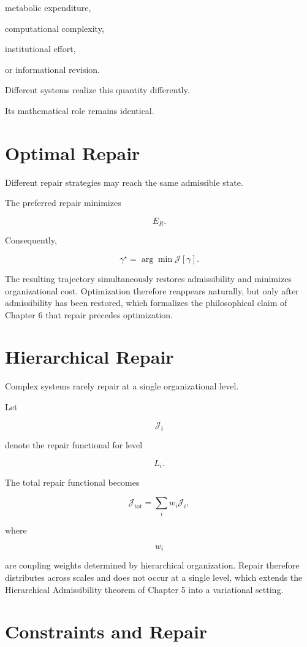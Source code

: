 \documentclass[11pt,oneside]{book}
\numberwithin{equation}{chapter}
\theoremstyle{definition}
\theoremstyle{plain}
\begin{document}
metabolic expenditure,

computational complexity,

institutional effort,

or informational revision.

Different systems realize this quantity differently.

Its mathematical role remains identical.

\section{Optimal Repair}

Different repair strategies may reach the same admissible state.

The preferred repair minimizes

\[
E_R.
\]

Consequently,

\[
\gamma^\star
=
\arg\min
\mathcal J[\gamma].
\]

The resulting trajectory simultaneously restores admissibility and minimizes organizational cost. Optimization therefore reappears naturally, but only after admissibility has been restored, which formalizes the philosophical claim of Chapter 6 that repair precedes optimization.

\section{Hierarchical Repair}

Complex systems rarely repair at a single organizational level.

Let

\[
\mathcal J_i
\]

denote the repair functional for level

\[
L_i.
\]

The total repair functional becomes

\[
\mathcal J_{\mathrm{tot}}
=
\sum_i
w_i
\mathcal J_i,
\]

where

\[
w_i
\]

are coupling weights determined by hierarchical organization. Repair therefore distributes across scales and does not occur at a single level, which extends the Hierarchical Admissibility theorem of Chapter 5 into a variational setting.

\section{Constraints and Repair}
\end{document}
